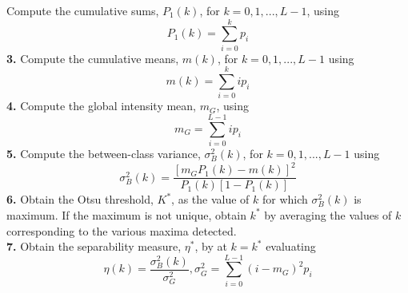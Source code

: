  Compute the cumulative sums, $P_1(k)$, for $k=0,1,...,L-1$, using \begin{equation} P_1(k)=\sum_{i=0}^k p_i \end{equation}
\textbf{3.} Compute the cumulative means, $m(k)$, for $k=0,1,...,L-1$ using \begin{equation} m(k)=\sum_{i=0}^k ip_i\end{equation}
\textbf{4.} Compute the global intensity mean, $m_G$, using \begin{equation} m_G=\sum_{i=0}^{L-1}ip_i \end{equation}
\textbf{5.} Compute the between-class variance, $\sigma^2_B(k)$, for $k=0,1,...,L-1$ using \begin{equation} \sigma_B^2(k)=\frac{[m_GP_1(k)-m(k)]^2}{P_1(k)[1-P_1(k)]}\end{equation}
\textbf{6.} Obtain the Otsu threshold, $K^*$, as the value of $k$ for which $\sigma_B^2(k)$ is maximum. If the maximum is not unique, obtain $k^*$ by averaging the values of $k$ corresponding to the various maxima detected. \\
\textbf{7.} Obtain the separability measure, $\eta ^ *$, by at $k=k^*$ evaluating \begin{equation} \eta(k)=\frac{\sigma_B^2(k)}{\sigma_G^2}, \sigma_G^2=\sum_{i=0}^{L-1}(i-m_G)^2p_i \end{equation} 




 